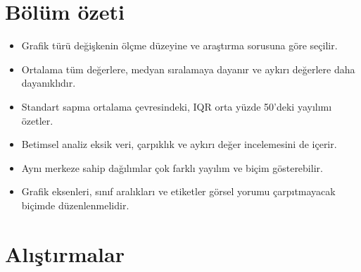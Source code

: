 



\section{Bölüm özeti}

\begin{itemize}
  \item Grafik türü değişkenin ölçme düzeyine ve araştırma sorusuna göre seçilir.
  \item Ortalama tüm değerlere, medyan sıralamaya dayanır ve aykırı değerlere daha dayanıklıdır.
  \item Standart sapma ortalama çevresindeki, IQR orta yüzde 50'deki yayılımı özetler.
  \item Betimsel analiz eksik veri, çarpıklık ve aykırı değer incelemesini de içerir.
  \item Aynı merkeze sahip dağılımlar çok farklı yayılım ve biçim gösterebilir.
  \item Grafik eksenleri, sınıf aralıkları ve etiketler görsel yorumu
  çarpıtmayacak biçimde düzenlenmelidir.
\end{itemize}

\section*{Alıştırmalar}

